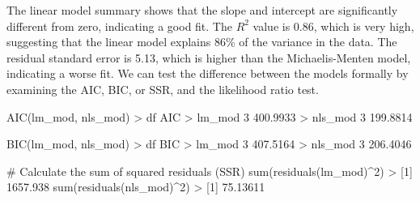 \documentclass[
  letterpaper,
]{book}
\newenvironment{Shaded}{\begin{snugshade}}{\end{snugshade}}
\newcommand{\CommentTok}[1]{\textcolor[rgb]{0.37,0.37,0.37}{#1}}
\newcommand{\DecValTok}[1]{\textcolor[rgb]{0.68,0.00,0.00}{#1}}
\newcommand{\FloatTok}[1]{\textcolor[rgb]{0.68,0.00,0.00}{#1}}
\newcommand{\FunctionTok}[1]{\textcolor[rgb]{0.28,0.35,0.67}{#1}}
\newcommand{\NormalTok}[1]{\textcolor[rgb]{0.00,0.23,0.31}{#1}}
\newcommand{\SpecialCharTok}[1]{\textcolor[rgb]{0.37,0.37,0.37}{#1}}
\begin{document}
The linear model summary shows that the slope and intercept are
significantly different from zero, indicating a good fit. The \(R^2\)
value is 0.86, which is very high, suggesting that the linear model
explains 86\% of the variance in the data. The residual standard error
is 5.13, which is higher than the Michaelis-Menten model, indicating a
worse fit. We can test the difference between the models formally by
examining the AIC, BIC, or SSR, and the likelihood ratio test.

\begin{Shaded}
\begin{Highlighting}[]
\FunctionTok{AIC}\NormalTok{(lm\_mod, nls\_mod)}
\SpecialCharTok{\textgreater{}}\NormalTok{         df      AIC}
\SpecialCharTok{\textgreater{}}\NormalTok{ lm\_mod   }\DecValTok{3} \FloatTok{400.9933}
\SpecialCharTok{\textgreater{}}\NormalTok{ nls\_mod  }\DecValTok{3} \FloatTok{199.8814}
\end{Highlighting}
\end{Shaded}

\begin{Shaded}
\begin{Highlighting}[]
\FunctionTok{BIC}\NormalTok{(lm\_mod, nls\_mod)}
\SpecialCharTok{\textgreater{}}\NormalTok{         df      BIC}
\SpecialCharTok{\textgreater{}}\NormalTok{ lm\_mod   }\DecValTok{3} \FloatTok{407.5164}
\SpecialCharTok{\textgreater{}}\NormalTok{ nls\_mod  }\DecValTok{3} \FloatTok{206.4046}
\end{Highlighting}
\end{Shaded}

\begin{Shaded}
\begin{Highlighting}[]
\CommentTok{\# Calculate the sum of squared residuals (SSR)}
\FunctionTok{sum}\NormalTok{(}\FunctionTok{residuals}\NormalTok{(lm\_mod)}\SpecialCharTok{\^{}}\DecValTok{2}\NormalTok{)}
\SpecialCharTok{\textgreater{}}\NormalTok{ [}\DecValTok{1}\NormalTok{] }\FloatTok{1657.938}
\FunctionTok{sum}\NormalTok{(}\FunctionTok{residuals}\NormalTok{(nls\_mod)}\SpecialCharTok{\^{}}\DecValTok{2}\NormalTok{)}
\SpecialCharTok{\textgreater{}}\NormalTok{ [}\DecValTok{1}\NormalTok{] }\FloatTok{75.13611}
\end{Highlighting}
\end{Shaded}
\end{document}
